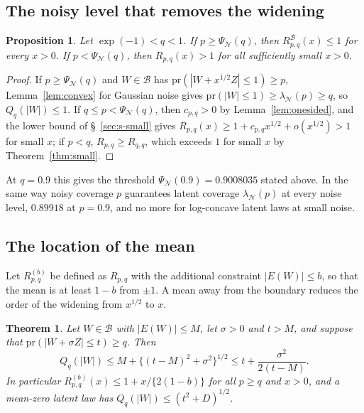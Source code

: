 \documentclass[12pt]{article}
\renewcommand{\_}{\usc\allowbreak}
\newtheorem{theorem}{Theorem}
\newtheorem{proposition}{Proposition}
\theoremstyle{definition}
\numberwithin{equation}{section}
\newcommand{\pr}{\mathrm{pr}}
\newcommand{\B}{\mathcal{B}}
\newcommand{\N}{\mathcal{N}}
\begin{document}
\subsection{The noisy level that removes the widening}\label{sec:s-slack}

\begin{proposition}\label{prop:slack}
Let $\exp(-1) < q < 1$. If $p \ge \Psi_{\N}(q)$, then $R^{\B}_{p,q}(x) \le 1$ for every $x > 0$. If $p < \Psi_{\N}(q)$, then $R_{p,q}(x) > 1$ for all sufficiently small $x > 0$.
\end{proposition}

\begin{proof}
If $p \ge \Psi_{\N}(q)$ and $W \in \B$ has $\pr(|W + x^{1/2}Z| \le 1) \ge p$, Lemma~\ref{lem:convex} for Gaussian noise gives $\pr(|W| \le 1) \ge \lambda_{\N}(p) \ge q$, so $Q_q(|W|) \le 1$. If $q \le p < \Psi_{\N}(q)$, then $c_{p,q} > 0$ by Lemma~\ref{lem:onesided}, and the lower bound of \S~\ref{sec:s-small} gives $R_{p,q}(x) \ge 1 + c_{p,q}x^{1/2} + o(x^{1/2}) > 1$ for small $x$; if $p < q$, $R_{p,q} \ge R_{q,q}$, which exceeds $1$ for small $x$ by Theorem~\ref{thm:small}.
\end{proof}

At $q = 0.9$ this gives the threshold $\Psi_{\N}(0.9) = 0.9008035$ stated above. In the same way noisy coverage $p$ guarantees latent coverage $\lambda_{\N}(p)$ at every noise level, $0.89918$ at $p = 0.9$, and no more for log-concave latent laws at small noise.

\subsection{The location of the mean}\label{sec:s-mean}

Let $R^{(b)}_{p,q}$ be defined as $R_{p,q}$ with the additional constraint $|E(W)| \le b$, so that the mean is at least $1 - b$ from $\pm1$. A mean away from the boundary reduces the order of the widening from $x^{1/2}$ to $x$.

\begin{theorem}\label{thm:mean}
Let $W \in \B$ with $|E(W)| \le M$, let $\sigma > 0$ and $t > M$, and suppose that $\pr(|W + \sigma Z| \le t) \ge q$. Then
\[
Q_q(|W|) \le M + \{(t - M)^2 + \sigma^2\}^{1/2} \le t + \frac{\sigma^2}{2(t - M)}.
\]
In particular $R^{(b)}_{p,q}(x) \le 1 + x/\{2(1 - b)\}$ for all $p \ge q$ and $x > 0$, and a mean-zero latent law has $Q_q(|W|) \le (t^2 + D)^{1/2}$.
\end{theorem}
\end{document}

